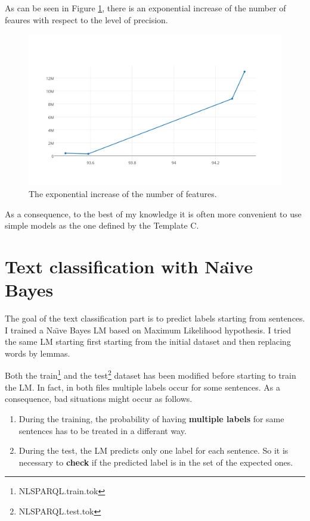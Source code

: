 \documentclass[a4paper,7pt,oneside]{book}
\begin{document}
\newpage
\noindent
As can be seen in Figure \ref{fig:crf_exp_num_features}, there is an exponential increase of the number of feaures with respect to the level of precision.

\begin{figure}[h]
  \centering
    \includegraphics[scale=0.5]{res/crf_exp_num_features}
    \caption{The exponential increase of the number of features.}
    \label{fig:crf_exp_num_features}
\end{figure}

\noindent
As a consequence, to the best of my knowledge it is often more convenient to use simple models as the one defined by the Template C.

\chapter{Text classification with Na\"{\i}ve Bayes}

The goal of the text classification part is to predict labels starting from sentences. I trained a Na\"{\i}ve Bayes LM  based on Maximum Likelihood hypothesis. I tried the same LM starting first starting from the initial dataset and then replacing words by lemmas.

Both the train\footnote{NLSPARQL.train.tok} and the test\footnote{NLSPARQL.test.tok} dataset has been modified before starting to train the LM. In fact, in both files multiple labels occur for some sentences. As a consequence, bad situations might occur as follows.
\begin{enumerate}
\item During the training, the probability of having \textbf{multiple labels} for same sentences has to be treated in a differant way.
\item During the test, the LM predicts only one label for each sentence. So it is necessary to \textbf{check} if the predicted label is in the set of the expected ones.
\end{enumerate}
\end{document}
